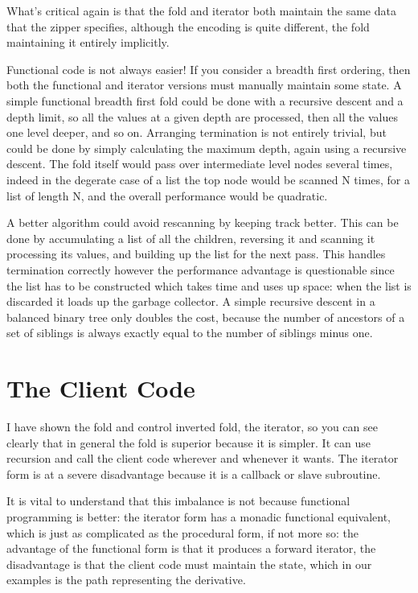 \documentclass[oneside]{book}
\begin{document}
What's critical again is that the fold and iterator both maintain
the same data that the zipper specifies, although the encoding
is quite different, the fold maintaining it entirely implicitly.

Functional code is not always easier! If you consider a breadth
first ordering, then both the functional and iterator versions
must manually maintain some state. A simple functional breadth first fold could be 
done with a recursive descent and a depth limit, so all the values at a given
depth are processed, then all the values one level deeper, and so on.
Arranging termination is not entirely trivial, but could be done by simply
calculating the maximum depth, again using a recursive descent. 
The fold itself would pass over intermediate level nodes several times,
indeed in the degerate case of a list the top node would be scanned
N times, for a list of length N, and the overall performance would be
quadratic.

A better algorithm could avoid rescanning by keeping track better.
This can be done by accumulating a list of all the children, reversing
it and scanning it processing its values, and building up the list
for the next pass. This handles termination correctly however the
performance advantage is questionable since the list has to be constructed
which takes time and uses up space: when the list is discarded it
loads up the garbage collector. A simple recursive descent in a balanced
binary tree only doubles the cost, because the number of ancestors of
a set of siblings is always exactly equal to the number of siblings
minus one.

\section{The Client Code}
I have shown the fold and control inverted fold, the iterator,
so you can see clearly that in general the fold is superior because
it is simpler. It can use recursion and call the client code wherever
and whenever it wants. The iterator form is at a severe disadvantage
because it is a callback or slave subroutine.

It is vital to understand that this imbalance is not because functional
programming is better: the iterator form has a monadic functional
equivalent, which is just as complicated as the procedural form,
if not more so: the advantage of the functional form is that it 
produces a forward iterator, the disadvantage is that the client
code must maintain the state, which in our examples is the path
representing the derivative.
\end{document}
